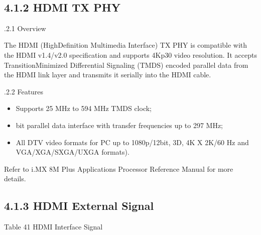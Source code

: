 \documentclass[letterpaper,10pt,openany,english]{sphinxmanual}
\begin{document}
\sphinxAtStartPar
{}\\


\subsection{4.1.2 HDMI TX PHY}
\label{\detokenize{hardware:hdmi-tx-phy}}
.2.1 Overview

\sphinxAtStartPar
The HDMI (High\sphinxhyphen{}Definition Multimedia Interface) TX PHY is compatible with the HDMI v1.4/v2.0 specification and supports 4Kp30 video resolution. It accepts TransitionMinimized Differential Signaling (TMDS) encoded parallel data from the HDMI link layer and transmits it serially into the HDMI cable.

.2.2 Features
\begin{itemize}
\item {} 
\sphinxAtStartPar
Supports 25 MHz to 594 MHz TMDS clock;

\item {} 
\sphinxhyphen{}bit parallel data interface with transfer frequencies up to 297 MHz;

\item {} 
\sphinxAtStartPar
All DTV video formats for PC up to 1080p/12\sphinxhyphen{}bit, 3D, 4K X 2K/60 Hz and VGA/XGA/SXGA/UXGA formats).

\end{itemize}

\sphinxAtStartPar
Refer to i.MX 8M Plus Applications Processor Reference Manual for more details.


\subsection{4.1.3 HDMI External Signal}
\label{\detokenize{hardware:hdmi-external-signal}}
\sphinxAtStartPar
Table 4\sphinxhyphen{}1 HDMI Interface Signal
\end{document}
